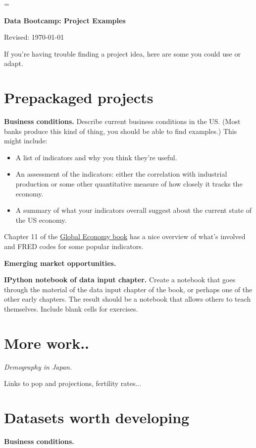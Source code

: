 \documentclass[11pt]{article}
\begin{document}
\parskip=\bigskipamount
\parindent=0.0in
\thispagestyle{empty}


\bigskip\bigskip
\centerline{\Large \bf Data Bootcamp:  Project Examples}
\centerline{Revised: \today}

\medskip
If you're having trouble finding a project idea, here are some you could use or adapt.

\section{Prepackaged projects}

{\bf Business conditions.\/}  Describe current business conditions in the US.
(Most banks produce this kind of thing, you should be able to find examples.)
This might include:
\begin{itemize}
\item A list of indicators and why you think they're useful.
\item An assessment of the indicators:  either the correlation with industrial production
or some other quantitative measure of how closely it tracks the economy.
\item A summary of what your indicators overall suggest about the current state
of the US economy.
\end{itemize}
Chapter 11 of the \href{(http://www.stern.nyu.edu/experience-stern/about/departments-centers-initiatives/centers-of-research/global-economy-business/development-initiatives/global-economy-course}
{Global Economy book} has a nice overview of what's involved
and FRED codes for some popular indicators.

{\bf Emerging market opportunities.\/}


{\bf IPython notebook of data input chapter.\/}
Create a notebook that goes through the material of the data input chapter of the book,
or perhaps one of the other early chapters.
The result should be a notebook that allows others to teach themselves.
Include blank cells for exercises.


\section{More work..}

{\it Demography in Japan.\/}

Links to pop and projections, fertility rates...


\section*{Datasets worth developing}



{\bf Business conditions.\/}



\end{document}
